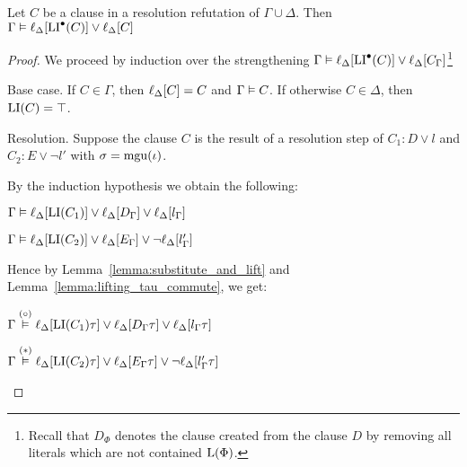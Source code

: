 \documentclass[,%
	draft=false,%
	numbers=noendperiod
	11pt,
	a4paper,
	oneside,%
	openany,
]{memoir}
\begin{document}

\begin{lemma}
	\label{lemma:gamma_entails_delta_lifted_preinvariant}
	Let $C$ be a clause in a resolution refutation of $\Gamma \cup \Delta$.
	Then
	$\Gamma \vDash \ell_{\Delta}[ \operatorname{LI}^\bullet(C) ] \lor \ell_{\Delta}[C] $
\end{lemma}
\begin{proof}
	We proceed by induction over the strengthening
	$\Gamma \vDash \ell_{\Delta}[ \operatorname{LI}^\bullet(C) ] \lor \ell_{\Delta}[C_\Gamma]$\footnote{Recall that $D_\Phi$ denotes the clause created from the clause $D$ by removing all literals which are not contained $\operatorname{L}(\Phi)$.}


	\begin{description}
		\item{} Base case.
			If $C\in \Gamma$, then $\ell_{\Delta}[C] = C$ and $\Gamma \vDash C$.
			If otherwise $C \in \Delta$, then $\operatorname{LI}(C) = \top$.

		\item{} Resolution.
			Suppose the clause $C$ is the result of a resolution step \inference{} of $C_1: D \lor l$ and $C_2: E \lor \lnot l'$ with $\sigma = \operatorname{mgu}(\iota)$.

			By the induction hypothesis we obtain the following:

			$\Gamma \vDash \ell_{\Delta}[\operatorname{LI}(C_1)] \lor \ell_{\Delta}[D_\Gamma] \lor \ell_{\Delta}[l_\Gamma]$

			$\Gamma \vDash \ell_{\Delta}[\operatorname{LI}(C_2)] \lor \ell_{\Delta}[E_\Gamma] \lor \lnot \ell_{\Delta}[l'_\Gamma]$

			Hence by Lemma~\ref{lemma:substitute_and_lift} and Lemma~\ref{lemma:lifting_tau_commute}, we get:

			$\Gamma \stackrel{(\circ)}{\vDash} \ell_{\Delta}[\operatorname{LI}(C_1)\tau] \lor \ell_{\Delta}[D_\Gamma\tau] \lor \ell_{\Delta}[l_\Gamma\tau]$

			$\Gamma \stackrel{(*)}{\vDash} \ell_{\Delta}[\operatorname{LI}(C_2)\tau] \lor \ell_{\Delta}[E_\Gamma\tau] \lor \lnot \ell_{\Delta}[l'_\Gamma\tau]$


\end{description}
\end{proof}
\end{document}
